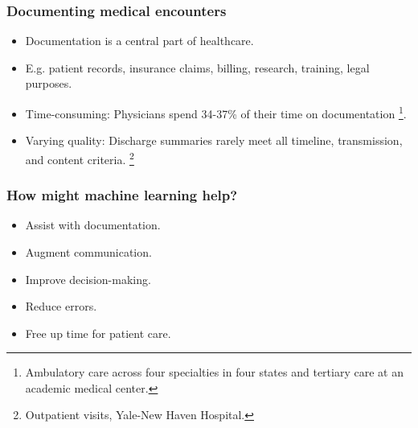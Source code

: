 


\begin{frame}
    \frametitle{Documenting medical encounters}
    \begin{itemize}
        \item <1,2> Documentation is a central part of healthcare.
        \item <1,2> E.g. patient records, insurance claims, billing, research, training, legal purposes.
        \vspace{1em}
        \item <2> {\color{dtured}Time-consuming}: Physicians spend 34-37\% of their time on documentation \cite{joukes_time_2018, tipping_where_2010, sinsky_allocation_2016}\footnote{Ambulatory care across four specialties in four states and tertiary care at an academic medical center.}.
        \item <2> {\color{dtured}Varying quality}: Discharge summaries rarely meet all timeline, transmission, and content criteria. \cite{horwitz_comprehensive_2013}\footnote{Outpatient visits, Yale-New Haven Hospital.}
    \end{itemize}
    
\end{frame}


\begin{frame}
    \frametitle{How might machine learning help?}
    \begin{itemize}
        \item <1-> {\color{dtured}Assist} with documentation.
        \item <1-> {\color{dtured}Augment} communication.
        \item <1-> {\color{dtured}Improve} decision-making.
        \vspace{1em}
        \item <2-> {\color{dtured}Reduce} errors.
        \item <2-> {\color{dtured}Free up} time for patient care.
    \end{itemize}
\end{frame}


